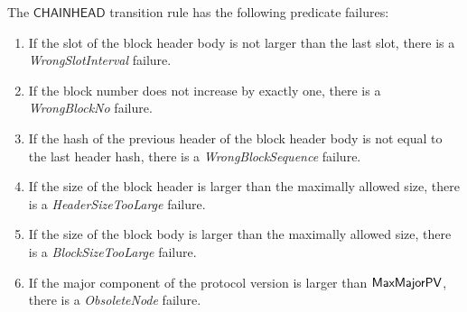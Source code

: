 The $\mathsf{CHAINHEAD}$ transition rule has the following predicate failures:
\begin{enumerate}
\item \label{itm:chainhead-failures-1} If the slot of the block header body is not larger than the last slot,
  there is a \emph{WrongSlotInterval} failure.
\item \label{itm:chainhead-failures-2} If the block number does not increase by exactly one,
  there is a \emph{WrongBlockNo} failure.
\item \label{itm:chainhead-failures-3} If the hash of the previous header of the block header body is not equal
  to the last header hash, there is a \emph{WrongBlockSequence} failure.
\item \label{itm:chainhead-failures-4} If the size of the block header is larger than the maximally allowed size,
  there is a \emph{HeaderSizeTooLarge} failure.
\item \label{itm:chainhead-failures-5} If the size of the block body is larger than the maximally allowed size,
  there is a \emph{BlockSizeTooLarge} failure.
\item \label{itm:chainhead-failures-6} If the major component of the protocol version is larger than $\mathsf{MaxMajorPV}$,
  there is a \emph{ObsoleteNode} failure.
\end{enumerate}

